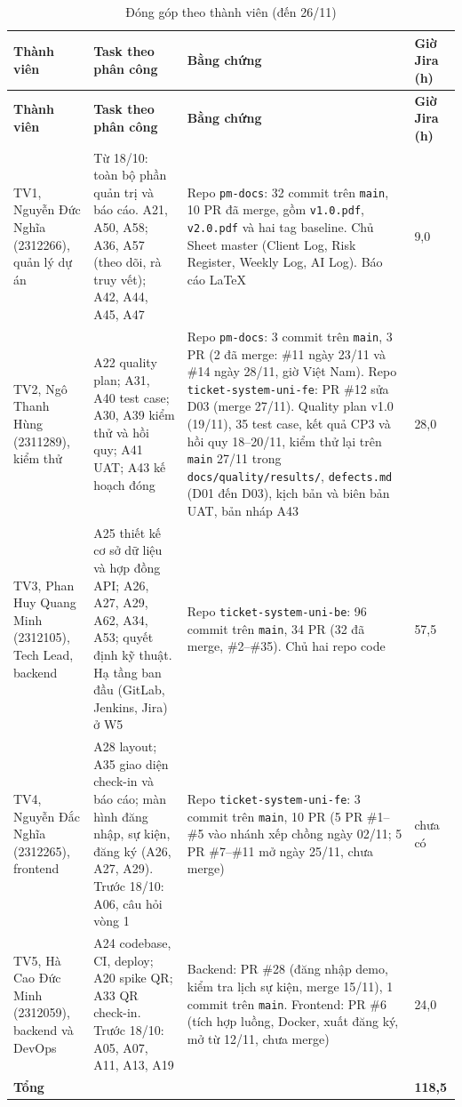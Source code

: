 \begingroup\tblsetup\footnotesize\tblzebra
\begin{longtable}{L{2.6cm}L{4.6cm}L{5.8cm}L{1.6cm}}
\caption{Đóng góp theo thành viên (đến 26/11)}\label{tab:contributions}\\
\toprule
{}\textbf{Thành viên} & \textbf{Task theo phân công} & \textbf{Bằng chứng} & \textbf{Giờ Jira (h)} \\
\midrule
\endfirsthead
\toprule
{}\textbf{Thành viên} & \textbf{Task theo phân công} & \textbf{Bằng chứng} & \textbf{Giờ Jira (h)} \\
\midrule
\endhead
\bottomrule
\endlastfoot
TV1, Nguyễn Đức Nghĩa (2312266), quản lý dự án & Từ 18/10: toàn bộ phần quản trị và báo cáo. A21, A50, A58; A36, A57 (theo dõi, rà truy vết); A42, A44, A45, A47 & Repo \texttt{pm-docs}: 32 commit trên \texttt{main}, 10 PR đã merge, gồm \texttt{v1.0.pdf}, \texttt{v2.0.pdf} và hai tag baseline. Chủ Sheet master (Client Log, Risk Register, Weekly Log, AI Log). Báo cáo LaTeX & 9,0 \\
TV2, Ngô Thanh Hùng (2311289), kiểm thử & A22 quality plan; A31, A40 test case; A30, A39 kiểm thử và hồi quy; A41 UAT; A43 kế hoạch đóng & Repo \texttt{pm-docs}: 3 commit trên \texttt{main}, 3 PR (2 đã merge: \#11 ngày 23/11 và \#14 ngày 28/11, giờ Việt Nam). Repo \texttt{ticket-system-uni-fe}: PR \#12 sửa D03 (merge 27/11). Quality plan v1.0 (19/11), 35 test case, kết quả CP3 và hồi quy 18--20/11, kiểm thử lại trên \texttt{main} 27/11 trong \texttt{docs/\allowbreak quality/\allowbreak results/}, \texttt{defects.md} (D01 đến D03), kịch bản và biên bản UAT, bản nháp A43 & 28,0 \\
TV3, Phan Huy Quang Minh (2312105), Tech Lead, backend & A25 thiết kế cơ sở dữ liệu và hợp đồng API; A26, A27, A29, A62, A34, A53; quyết định kỹ thuật. Hạ tầng ban đầu (GitLab, Jenkins, Jira) ở W5 & Repo \texttt{ticket-system-uni-be}: 96 commit trên \texttt{main}, 34 PR (32 đã merge, \#2--\#35). Chủ hai repo code & 57,5 \\
TV4, Nguyễn Đắc Nghĩa (2312265), frontend & A28 layout; A35 giao diện check-in và báo cáo; màn hình đăng nhập, sự kiện, đăng ký (A26, A27, A29). Trước 18/10: A06, câu hỏi vòng 1 & Repo \texttt{ticket-system-uni-fe}: 3 commit trên \texttt{main}, 10 PR (5 PR \#1--\#5 vào nhánh xếp chồng ngày 02/11; 5 PR \#7--\#11 mở ngày 25/11, chưa merge) & chưa có \\
TV5, Hà Cao Đức Minh (2312059), backend và DevOps & A24 codebase, CI, deploy; A20 spike QR; A33 QR check-in. Trước 18/10: A05, A07, A11, A13, A19 & Backend: PR \#28 (đăng nhập demo, kiểm tra lịch sự kiện, merge 15/11), 1 commit trên \texttt{main}. Frontend: PR \#6 (tích hợp luồng, Docker, xuất đăng ký, mở từ 12/11, chưa merge) & 24,0 \\
\midrule
\textbf{Tổng} & & & \textbf{118,5} \\
\end{longtable}
\endgroup
